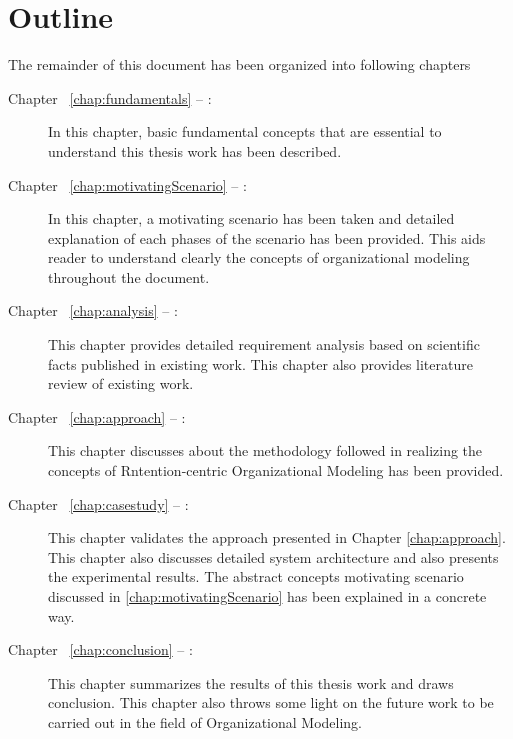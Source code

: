 \section {Outline}
\label{sec:outline}
The remainder of this document has been organized into following chapters
\begin{description}
	\item[Chapter ~\ref{chap:fundamentals} -- :] In this chapter, basic fundamental concepts that are essential to understand this thesis work has been described.
	\item[Chapter ~\ref{chap:motivatingScenario} -- :] In this chapter, a motivating scenario has been taken and detailed explanation of each phases of the scenario has been provided. This aids reader to understand clearly the concepts of organizational modeling throughout the document. 
	\item[Chapter ~\ref{chap:analysis} -- :] This chapter provides detailed requirement analysis based on scientific facts published in existing work. This chapter also provides literature review of existing work.
	\item[Chapter ~\ref{chap:approach} -- :] This chapter discusses about the methodology followed in realizing the concepts  of Rntention-centric Organizational Modeling has been provided.
	\item[Chapter ~\ref{chap:casestudy} -- :] This chapter validates the approach presented in Chapter \ref{chap:approach}. This chapter also discusses detailed system architecture and also presents the experimental results. The abstract concepts motivating scenario discussed in \ref{chap:motivatingScenario} has been explained in a concrete way.	
	\item[Chapter ~\ref{chap:conclusion} -- :] This chapter summarizes  the results of this thesis work and draws conclusion. This chapter also throws some light on the future work to be carried out in the field of Organizational Modeling. 
\end{description}